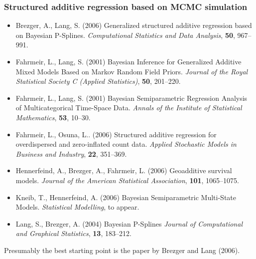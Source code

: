 \documentclass[11pt,a4paper,twoside]{bayesxarticle}
\begin{document}
\subsubsection*{Structured additive regression based on MCMC
simulation}

\begin{itemize}
\item Brezger, A., Lang, S. (2006)
      Generalized structured additive regression based on Bayesian P-Splines.
      {\it Computational Statistics and Data Analysis}, {\bf 50},
      967--991.\vspace{-0.25cm}
\item Fahrmeir, L., Lang, S. (2001)
      Bayesian Inference for Generalized Additive Mixed Models Based on Markov Random Field Priors.
      {\it Journal of the Royal Statistical Society C (Applied Statistics)}, {\bf 50}, 201--220.\vspace{-0.25cm}
\item Fahrmeir, L., Lang, S. (2001)
      Bayesian Semiparametric Regression Analysis of Multicategorical Time-Space Data.
      {\it Annals of the Institute of Statistical Mathematics}, {\bf 53}, 10--30.\vspace{-0.25cm}
\item Fahrmeir, L., Osuna, L.. (2006)
      Structured additive regression for overdispersed and zero-inflated count data.
      {\it Applied Stochastic Models in Business and Industry}, {\bf 22}, 351--369.\vspace{-0.25cm}
\item Hennerfeind, A., Brezger, A., Fahrmeir, L. (2006)
      Geoadditive survival models.
      {\it Journal of the American Statistical Association}, {\bf 101}, 1065--1075.\vspace{-0.25cm}
\item Kneib, T., Hennerfeind, A. (2006)
      Bayesian Semiparametric Multi-State Models.
      {\it Statistical Modelling}, to appear.\vspace{-0.25cm}
\item Lang, S., Brezger, A. (2004)
      Bayesian P-Splines
      {\it Journal of Computational and Graphical Statistics}, {\bf 13}, 183--212.
\end{itemize}

Presumably the best starting point is the paper by Brezger and Lang (2006).
\end{document}

